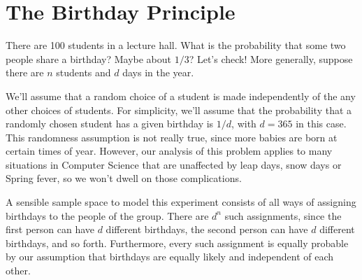 \section{The Birthday Principle}\label{birthday_principle_sec}

There are 100 students in a lecture hall.  What is the probability that
some two people share a birthday?  Maybe about $1/3$?  Let's check!  More
generally, suppose there are $n$ students and $d$ days in the year.

We'll assume that a random choice of a student is made independently of
the any other choices of students.  For simplicity, we'll assume that the
probability that a randomly chosen student has a given birthday is $1/d$,
with $d= 365$ in this case.  This randomness assumption is not really
true, since more babies are born at certain times of year.  However, our
analysis of this problem applies to many situations in Computer Science
that are unaffected by leap days, snow days or Spring fever, so we won't
dwell on those complications.

A sensible sample space to model this experiment consists of all ways of
assigning birthdays to the people of the group.  There are $d^n$ such
assignments, since the first person can have $d$ different birthdays, the
second person can have $d$ different birthdays, and so forth.
Furthermore, every such assignment is equally probable by our assumption
that birthdays are equally likely and independent of each other.

